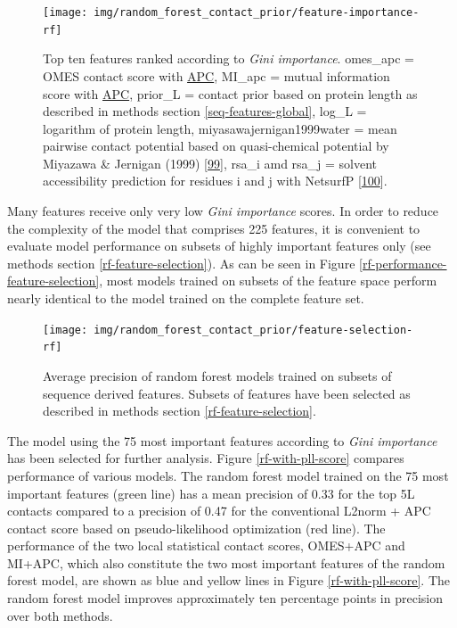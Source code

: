 \documentclass[12pt,a4paper,twoside]{book}
\theoremstyle{definition}
\theoremstyle{definition}
\theoremstyle{remark}
\begin{document}
\begin{figure}
\texttt{[image: img/random\_forest\_contact\_prior/feature-importance-rf]} \caption{Top ten features ranked according to
\emph{Gini importance}. omes\_apc = OMES contact score with
\protect\hyperlink{abbrev}{APC}, MI\_apc = mutual information score with
\protect\hyperlink{abbrev}{APC}, prior\_L = contact prior based on
protein length as described in methods section
\ref{seq-features-global}, log\_L = logarithm of protein length,
miyasawajernigan1999water = mean pairwise contact potential based on
quasi-chemical potential by Miyazawa \& Jernigan (1999)
{[}\protect\hyperlink{ref-Miyazawa1999a}{99}{]}, rsa\_i amd rsa\_j =
solvent accessibility prediction for residues i and j with NetsurfP
{[}\protect\hyperlink{ref-Petersen2009a}{100}{]}.}\label{fig:rf-feature-importance}
\end{figure}

Many features receive only very low \emph{Gini importance} scores. In
order to reduce the complexity of the model that comprises 225 features,
it is convenient to evaluate model performance on subsets of highly
important features only (see methods section
\ref{rf-feature-selection}). As can be seen in Figure
\ref{rf-performance-feature-selection}, most models trained on subsets
of the feature space perform nearly identical to the model trained on
the complete feature set.






\begin{figure}
\texttt{[image: img/random\_forest\_contact\_prior/feature-selection-rf]} \caption{Average precision of
random forest models trained on subsets of sequence derived features.
Subsets of features have been selected as described in methods section
\ref{rf-feature-selection}.}\label{fig:rf-performance-feature-selection}
\end{figure}

The model using the 75 most important features according to \emph{Gini
importance} has been selected for further analysis. Figure
\ref{rf-with-pll-score} compares performance of various models. The
random forest model trained on the 75 most important features (green
line) has a mean precision of 0.33 for the top 5L contacts compared to a
precision of 0.47 for the conventional L2norm + APC contact score based
on pseudo-likelihood optimization (red line). The performance of the two
local statistical contact scores, OMES+APC and MI+APC, which also
constitute the two most important features of the random forest model,
are shown as blue and yellow lines in Figure \ref{rf-with-pll-score}.
The random forest model improves approximately ten percentage points in
precision over both methods.
\end{document}
